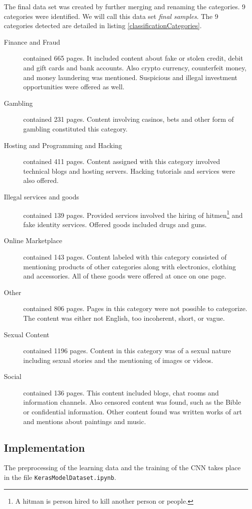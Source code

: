 The final data set was created by further merging and renaming the categories. 9 categories were identified. We will call this data set \textit{final samples}. The 9 categories detected are detailed in listing \ref{classificationCategories}.
 \label{classificationCategories}
\begin {description}
	\item[Finance and Fraud] contained 665 pages. It included content about fake or stolen credit, debit and gift cards and bank accounts. Also crypto currency, counterfeit money, and money laundering was mentioned. Suspicious and illegal investment opportunities were offered as well.
	\item[Gambling] contained 231 pages. Content involving casinos, bets and other form of gambling constituted this category.
	\item[Hosting and Programming and Hacking] contained 411 pages. Content assigned with this category involved technical blogs and hosting servers. Hacking tutorials and services were also offered.
	\item[Illegal services and goods] contained 139 pages. Provided services involved the hiring of hitmen\footnote{A hitman is person hired to kill another person or people.} and fake identity services. Offered goods included drugs and guns.
	\item[Online Marketplace] contained 143 pages. Content labeled with this category consisted of mentioning products of other categories along with electronics, clothing and accessories. All of these goods were offered at once on one page.
	\item[Other] contained 806 pages. Pages in this category were not possible to categorize. The content was either not English, too incoherent, short, or vague. 
	\item[Sexual Content] contained 1196 pages. Content in this category was of a sexual nature including sexual stories and the mentioning of images or videos.
	\item[Social] contained 136 pages. This content included blogs, chat rooms and information channels. Also censored content was found, such as the Bible or confidential information. Other content found was written works of art and mentions about paintings and music. 
\end{description}

\subsection{Implementation} \label{ClassificationImplementation}
The preprocessing of the learning data and the training of the CNN takes place in the file \texttt{KerasModelDataset.ipynb}. 

